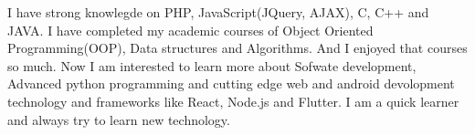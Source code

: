 \documentclass[a4paper,12pt]{article}
\begin{document}


I have strong knowlegde on PHP, JavaScript(JQuery, AJAX), C, C++ and JAVA. I have completed my academic courses of Object Oriented Programming(OOP), Data structures and Algorithms. And I enjoyed that courses so much. Now I am interested to learn more about Sofwate development, Advanced python programming and cutting edge web and android devolopment technology and frameworks like React, Node.js and Flutter. I am a quick learner and always try to learn new technology.
\end{document}
